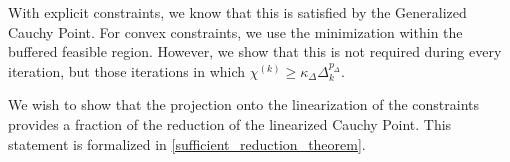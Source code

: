 \documentclass{article}
\theoremstyle{case}
\numberwithin{theorem}{subsection}
\newcommand{\chik}{{\chi^{(k)}}}
\newcommand{\dk}{\Delta_k}
\newcommand{\mfk}{{{m}_f}^{(k)}}
\newcommand{\sk}{{{s}^{(k)}}}
\newcommand{\xk}{x^{(k)}}
\begin{document}

With explicit constraints, we know that this is satisfied by the Generalized Cauchy Point.
For convex constraints, we use the minimization within the buffered feasible region.
However, we show that this is not required during every iteration, but those iterations in which $\chik \ge \kappa_{\Delta}\dk^{p_{\Delta}}$.


We wish to show that the projection onto the linearization of the constraints provides a fraction of the reduction of the linearized Cauchy Point.
This statement is formalized in \cref{sufficient_reduction_theorem}.
\end{document}
